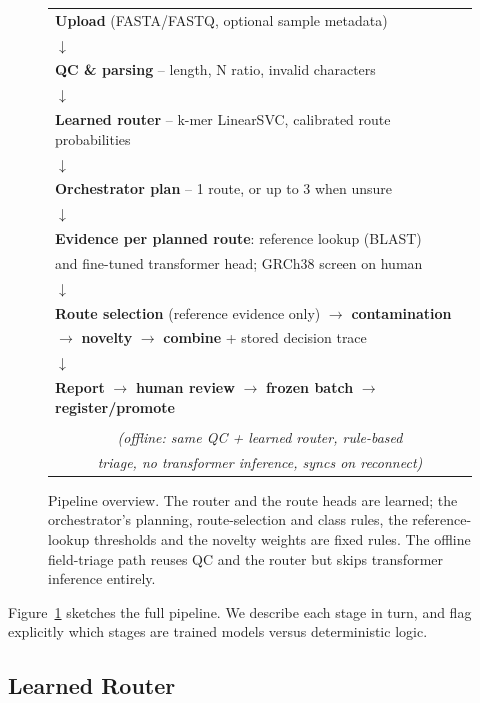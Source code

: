 \documentclass[conference]{IEEEtran}
\begin{document}
\begin{figure}[t]
\centering
\begin{minipage}{0.48\textwidth}
\footnotesize
\begin{tabular}{@{}l@{}}
\textbf{Upload} (FASTA/FASTQ, optional sample metadata) \\
$\downarrow$ \\
\textbf{QC \& parsing} -- length, N ratio, invalid characters \\
$\downarrow$ \\
\textbf{Learned router} -- k-mer LinearSVC, calibrated route probabilities \\
$\downarrow$ \\
\textbf{Orchestrator plan} -- 1 route, or up to 3 when unsure \\
$\downarrow$ \\
\textbf{Evidence per planned route}: reference lookup (BLAST) \\
\quad and fine-tuned transformer head; GRCh38 screen on human \\
$\downarrow$ \\
\textbf{Route selection} (reference evidence only) $\to$ \textbf{contamination} \\
\quad $\to$ \textbf{novelty} $\to$ \textbf{combine} + stored decision trace \\
$\downarrow$ \\
\textbf{Report} $\to$ \textbf{human review} $\to$ \textbf{frozen batch} $\to$ \textbf{register/promote} \\[0.3em]
\hline \\[-0.9em]
\multicolumn{1}{c}{\emph{(offline: same QC + learned router, rule-based}}\\
\multicolumn{1}{c}{\emph{triage, no transformer inference, syncs on reconnect)}}
\end{tabular}
\end{minipage}
\caption{Pipeline overview. The router and the route heads are learned; the orchestrator's planning, route-selection and class rules, the reference-lookup thresholds and the novelty weights are fixed rules. The offline field-triage path reuses QC and the router but skips transformer inference entirely.}
\label{fig:pipeline}
\end{figure}

Figure~\ref{fig:pipeline} sketches the full pipeline. We describe each stage in turn, and flag explicitly which stages are trained models versus deterministic logic.

\subsection{Learned Router}
\label{sec:router}
\end{document}
